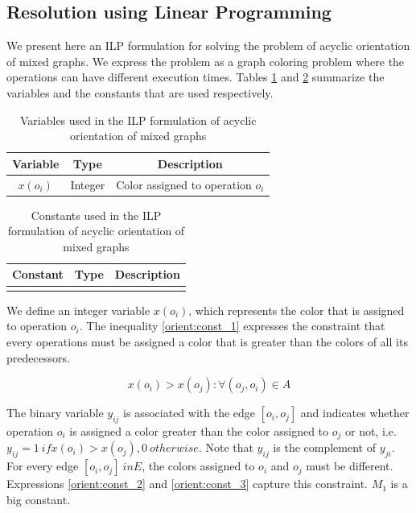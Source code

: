 \subsection{Resolution using Linear Programming}

We present here an ILP formulation for solving the problem of acyclic orientation of mixed graphs. We express the problem as a graph coloring problem where the operations can have different execution times.  Tables \ref{table:varilporient} and \ref{table:consilporient} summarize the variables and the constants that are used respectively.

\begin{table}
\caption{Variables used in the ILP formulation of acyclic orientation of mixed graphs}
\centering
\label{table:varilporient}
\begin{tabular}{c c c}
\toprule
Variable & Type & Description   \\
\midrule
 $x(o_i)$ & Integer & Color assigned to operation $o_i$  \\

\bottomrule
\end{tabular}
\end{table}

\begin{table}
\caption{Constants used in the ILP formulation of acyclic orientation of mixed graphs}
\centering
\label{table:consilporient}
\begin{tabular}{c c c}
\toprule
Constant & Type & Description   \\
\midrule

 &  &   \\

\bottomrule
\end{tabular}
\end{table}

We define an integer variable $x(o_i)$, which represents the color that is assigned to operation $o_i$. The inequality \ref{orient:const_1} expresses the constraint that every operations must be assigned a color that is greater than the colors of all its predecessors.

\begin{equation}
x(o_i) > x(o_j): \forall (o_j,o_i) \in A
\label{orient:const_1}
\end{equation}

The binary variable $y_{ij}$ is associated with the edge $[o_i,o_j]$ and indicates whether operation $o_i$ is assigned a color greater than the color assigned to $o_j$ or not, i.e. $y_{ij} = 1\ if x(o_i) > x(o_j), 0\ otherwise$. Note that $y_{ij}$ is the complement of $y_{ji}$. For every edge $[o_i,o_j] \ in E$, the colors assigned to $o_i$ and $o_j$ must be different. Expressions \ref{orient:const_2} and \ref{orient:const_3} capture this constraint. $M_1$ is a big constant.

